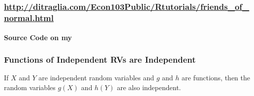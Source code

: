 \documentclass[handout]{beamer}
\begin{document}
\begin{frame}
	\frametitle{\normalsize \href{http://ditraglia.com/Econ103Public/Rtutorials/friends_of_normal.html}{http://ditraglia.com/Econ103Public/Rtutorials/friends\_of\_normal.html}}
\framesubtitle{Source Code on my \href{https://github.com/fditraglia/Econ103Public/blob/master/Rtutorials/friends_of_normal.R}{}}



\begin{figure}
\end{figure}

\end{frame}


\begin{frame}
\frametitle{Functions of Independent RVs are Independent}

If $X$ and $Y$ are independent random variables and $g$ and $h$ are functions, then the random variables $g(X)$ and $h(Y)$ are also independent.

\end{frame}
\end{document}
